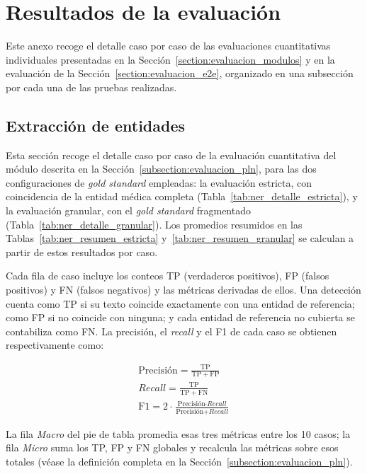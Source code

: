 \chapter{Resultados de la evaluación}\label{anexo:resultados_modulos_completos}

Este anexo recoge el detalle caso por caso de las evaluaciones cuantitativas individuales
presentadas en la Sección~\ref{section:evaluacion_modulos} y en la evaluación
 de la Sección~\ref{section:evaluacion_e2e}, organizado en una subsección
por cada una de las pruebas realizadas.

\section{Extracción de entidades }\label{anexo:resultados_ner_completos}

Esta sección recoge el detalle caso por caso de la evaluación cuantitativa del módulo
 descrita en la Sección~\ref{subsection:evaluacion_pln}, para las dos
configuraciones de \textit{gold standard} empleadas: la evaluación estricta, con coincidencia de
la entidad médica completa (Tabla~\ref{tab:ner_detalle_estricta}), y la evaluación granular, con el
\textit{gold standard} fragmentado (Tabla~\ref{tab:ner_detalle_granular}). Los promedios resumidos
en las Tablas~\ref{tab:ner_resumen_estricta} y~\ref{tab:ner_resumen_granular} se calculan a partir
de estos resultados por caso.

Cada fila de caso incluye los conteos TP (verdaderos positivos), FP (falsos positivos) y FN (falsos
negativos) y las métricas derivadas de ellos. Una detección cuenta como TP si su texto coincide
exactamente con una entidad de referencia; como FP si no coincide con ninguna; y cada entidad de
referencia no cubierta se contabiliza como FN. La precisión, el \textit{recall} y el F1 de cada caso
se obtienen respectivamente como:

\begin{gather*}
    \text{Precisión} = \frac{\mathrm{TP}}{\mathrm{TP} + \mathrm{FP}} \\[8pt]
    \textit{Recall} = \frac{\mathrm{TP}}{\mathrm{TP} + \mathrm{FN}} \\[8pt]
    \mathrm{F1} = 2 \cdot \frac{\text{Precisión} \cdot \textit{Recall}}{\text{Precisión} + \textit{Recall}}
\end{gather*}

La fila \textit{Macro} del pie de tabla promedia esas tres métricas entre los 10 casos; la fila
\textit{Micro} suma los TP, FP y FN globales y recalcula las métricas sobre esos totales (véase la
definición completa en la Sección~\ref{subsection:evaluacion_pln}).

